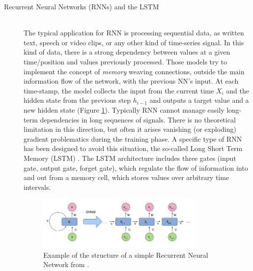 \begin{description}
    \item [Recurrent Neural Networks (RNNs) and the LSTM] \hfill \\
        The typical application for RNN is processing sequential data, as written text, speech or video clips, or any other kind of time-series signal. In this kind of data, there is a strong dependency between values at a given time/position and values previously processed. Those models try to implement the concept of \textit{memory} weaving connections, outside the main information flow of the network, with the previous NN's input. At each time-stamp, the model collects the input from the current time $X_i$ and the hidden state from the previous step $h_{i-1}$ and outputs a target value and a new hidden state (Figure \ref{fig:recNN}). Typically RNN cannot manage easily long-term dependencies in long sequences of signals. There is no theoretical limitation in this direction, but often it arises vanishing (or exploding) gradient problematics during the training phase. A specific type of RNN has been designed to avoid this situation, the so-called Long Short Term Memory (LSTM) \cite{LSTM}. The LSTM architecture includes three gates (input gate, output gate, forget gate), which regulate the flow of information into and out from a memory cell, which stores values over arbitrary time intervals.

        \begin{figure}
            \centering
            \includegraphics[width = 0.8\textwidth]{images/recNN}
            \caption{Example of the structure of a simple Recurrent Neural Network from  \cite{deep_seg_SOA}.}
            \label{fig:recNN}
        \end{figure}


\end{description}
